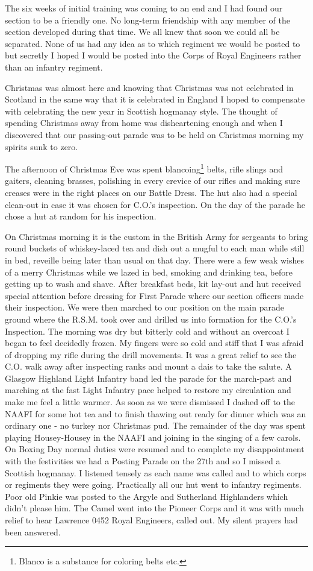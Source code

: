 The six weeks of initial training was coming to an end and I had found
our section to be a friendly one. No long-term friendship with any
member of the section developed during that time. We all knew that
soon we could all be separated. None of us had any idea as to which
regiment we would be posted to but secretly I hoped I would be posted
into the Corps of Royal Engineers rather than an infantry regiment.

Christmas was almost here and knowing that Christmas was not
celebrated in Scotland in the same way that it is celebrated in
England I hoped to compensate with celebrating the new year in
Scottish hogmanay style. The thought of spending Christmas away from
home was disheartening enough and when I discovered that our
passing-out parade was to be held on Christmas morning my spirits sunk
to zero. 

The afternoon of Christmas Eve was spent blancoing\footnote{Blanco is
a substance for coloring belts etc.} belts, rifle slings and
gaiters, cleaning brasses, polishing in every crevice of our rifles
and making sure creases were in the right places on our Battle
Dress. The hut also had a special clean-out in case it was chosen for
C.O.'s inspection. On the day of the parade he chose a hut at random
for his inspection.

On Christmas morning it is the custom in the British Army for
sergeants to bring round buckets of whiskey-laced tea and dish out a
mugful to each man while still in bed, reveille being later than usual
on that day. There were a few weak wishes of a merry Christmas while
we lazed in bed, smoking and drinking tea, before getting up to wash
and shave. After breakfast beds, kit lay-out and hut received special
attention before dressing for First Parade where our section officers
made their inspection. We were then marched to our position on the
main parade ground where the R.S.M. took over and drilled us into
formation for the C.O.'s Inspection. The morning was dry but bitterly
cold and without an overcoat I began to feel decidedly frozen. My
fingers were so cold and stiff that I was afraid of dropping my rifle
during the drill movements. It was a great relief to see the
C.O. walk away after inspecting ranks and mount a dais to take the
salute. A Glasgow Highland Light Infantry band led the parade for the
march-past and marching at the fast Light Infantry pace helped to
restore my circulation and make me feel a little warmer. As soon as
we were dismissed I dashed off to the NAAFI for some hot tea and to
finish thawing out ready for dinner which was an ordinary one - no
turkey nor Christmas pud. The remainder of the day was spent playing
Housey-Housey in the NAAFI and joining in the singing of a few carols.
On Boxing Day normal duties were resumed and to complete my
disappointment with the festivities we had a Posting Parade on the 27th
and so I missed a Scottish hogmanay. I listened tensely as each name
was called and to which corps or regiments they were going.
Practically all our hut went to infantry regiments. Poor old Pinkie
was posted to the Argyle and Sutherland Highlanders which didn't
please him. The Camel went into the Pioneer Corps and it was with
much relief to hear Lawrence 0452 Royal Engineers, called out. My
silent prayers had been answered. 

